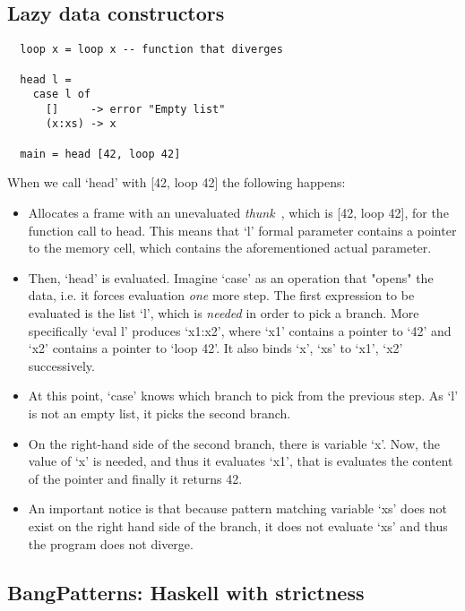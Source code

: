 \documentclass[diploma]{softlab-thesis}
\begin{document}
\subsection{Lazy data constructors}
\label{sec:lazy-data-cons}

\begin{verbatim}
  loop x = loop x -- function that diverges

  head l = 
    case l of 
      []     -> error "Empty list"
      (x:xs) -> x

  main = head [42, loop 42]
\end{verbatim}

When we call `head' with [42, loop 42] the following happens:
\begin {itemize}
  \item Allocates a frame with an unevaluated \textit{thunk}~\cite{Bloss1988}, which is [42, loop 42], for the function call to head.
  This means that `l' formal parameter contains a pointer to the memory cell, which contains the aforementioned actual parameter. 
  \item Then, `head' is evaluated. Imagine `case' as an operation that "opens" the data, i.e. it forces evaluation \textit{one} 
  more step. The first expression to be evaluated is the list `l', which is \textit{needed} in order to pick a branch. More 
  specifically `eval l' produces `x1:x2', where `x1' contains a pointer to `42' and `x2' contains a pointer to `loop 42'.
  It also binds `x', `xs' to `x1', `x2' successively.
  \item At this point, `case' knows which branch to pick from the previous step. As `l' is not an empty list, it picks the 
  second branch. 
  \item On the right-hand side of the second branch, there is variable `x'. Now, the value of `x' is needed, and thus 
  it evaluates `x1', that is evaluates the content of the pointer and finally it returns 42.
  \item An important notice is that because pattern matching variable `xs' does not exist on the right hand side 
  of the branch, it does not evaluate `xs' and thus the program does not diverge.
\end{itemize}

\subsection{BangPatterns: Haskell with strictness}
\label{sec:bangpatterns}
\end{document}
